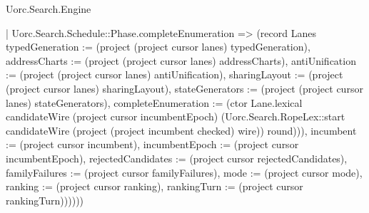 \begin{lexlean}{Uorc.Search.Engine}
\begin{semanticmodule}
{{      | Uorc.Search.Schedule::Phase.completeEnumeration => (record Lanes {typedGeneration := (project (project cursor lanes) typedGeneration), addressCharts := (project (project cursor lanes) addressCharts), antiUnification := (project (project cursor lanes) antiUnification), sharingLayout := (project (project cursor lanes) sharingLayout), stateGenerators := (project (project cursor lanes) stateGenerators), completeEnumeration := (ctor Lane.lexical candidateWire (project cursor incumbentEpoch) (Uorc.Search.RopeLex::start candidateWire (project (project incumbent checked) wire)) round)})), incumbent := (project cursor incumbent), incumbentEpoch := (project cursor incumbentEpoch), rejectedCandidates := (project cursor rejectedCandidates), familyFailures := (project cursor familyFailures), mode := (project cursor mode), ranking := (project cursor ranking), rankingTurn := (project cursor rankingTurn)})))))
}


\end{semanticmodule}
\end{lexlean}
